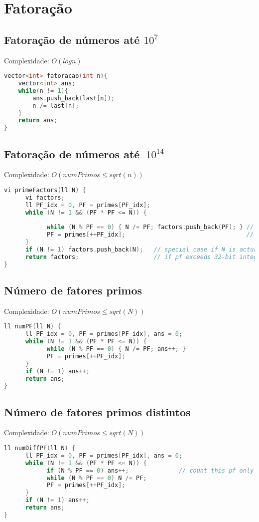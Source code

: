 \documentclass[12pt,a4paper,twoside]{report}
\begin{document}
\section{Fatoração}

\subsection{Fatoração de números até $10^7$}
Complexidade: $O(log n)$
\noindent\begin{lstlisting}[caption=Fatoração usando crivo,language=C++]
vector<int> fatoracao(int n){
    vector<int> ans;
    while(n != 1){
        ans.push_back(last[n]);
        n /= last[n];
    }
    return ans;
}
\end{lstlisting}

\subsection{Fatoração de números até $~10^{14}$}
Complexidade: $O(numPrimos \le sqrt(n))$
\noindent\begin{lstlisting}[caption=Fatoração usando crivo para números grandes,language=C++]
vi primeFactors(ll N) {   
      vi factors;                    
      ll PF_idx = 0, PF = primes[PF_idx];     
      while (N != 1 && (PF * PF <= N)) {   
            
            while (N % PF == 0) { N /= PF; factors.push_back(PF); } // remove this PF
            PF = primes[++PF_idx];                                  // only consider primes!
      }
      if (N != 1) factors.push_back(N);   // special case if N is actually a prime
      return factors;                     // if pf exceeds 32-bit integer, you have to change vi
}
\end{lstlisting}

\subsection{Número de fatores primos}
Complexidade: $O(numPrimos \le sqrt(N))$
\noindent\begin{lstlisting}[caption=Número de fatores primos,language=C++]
ll numPF(ll N) {
      ll PF_idx = 0, PF = primes[PF_idx], ans = 0;
      while (N != 1 && (PF * PF <= N)) {
            while (N % PF == 0) { N /= PF; ans++; }
            PF = primes[++PF_idx];
      }
      if (N != 1) ans++;
      return ans;
}
\end{lstlisting}

\subsection{Número de fatores primos distintos}
Complexidade: $O(numPrimos \le sqrt(N))$
\noindent\begin{lstlisting}[caption=Número de fatores primos distintos,language=C++]
ll numDiffPF(ll N) {
      ll PF_idx = 0, PF = primes[PF_idx], ans = 0;
      while (N != 1 && (PF * PF <= N)) {
            if (N % PF == 0) ans++;              // count this pf only once
            while (N % PF == 0) N /= PF;
            PF = primes[++PF_idx];
      }
      if (N != 1) ans++;
      return ans;
}
\end{lstlisting}
\end{document}
